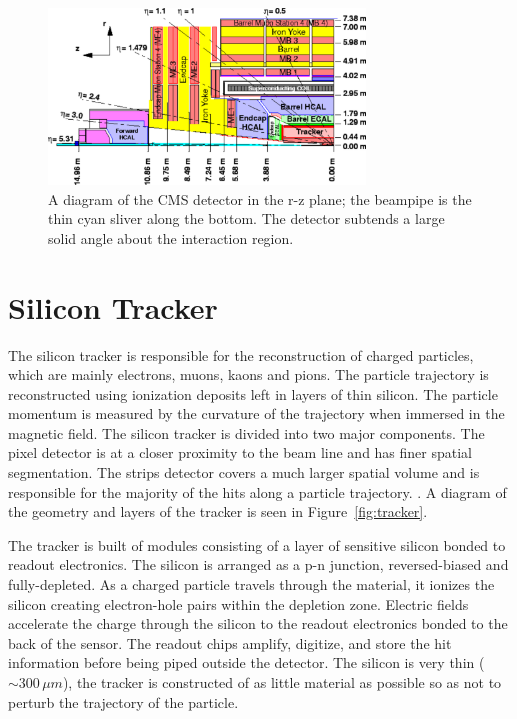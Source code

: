 \begin{figure}
\centering
\includegraphics[width=0.75\textwidth]{figs/img41.pdf}
\caption[A diagram of the CMS detector in the r-z plane.]{A diagram of the CMS detector in the r-z plane; the beampipe is the thin cyan sliver along the bottom. The detector subtends a large solid angle about the interaction region.}
\label{fig:detectoreta}
\end{figure}

\section{Silicon Tracker}

The silicon tracker is responsible for the reconstruction of charged particles, which are mainly electrons, muons, kaons and pions. The particle trajectory is reconstructed using ionization deposits left in layers of thin silicon. The particle momentum is measured by the curvature of the trajectory when immersed in the magnetic field. The silicon tracker is divided into two major components. The pixel detector is at a closer proximity to the beam line and has finer spatial segmentation. The strips detector covers a much larger spatial volume and is responsible for the majority of the hits along a particle trajectory. \cite{trackertdr, trackertdradd}. A diagram of the geometry and layers of the tracker is seen in Figure~\ref{fig:tracker}.

The tracker is built of modules consisting of a layer of sensitive silicon bonded to readout electronics. The silicon is arranged as a p-n junction, reversed-biased and fully-depleted. As a charged particle travels through the material, it ionizes the silicon creating electron-hole pairs within the depletion zone. Electric fields accelerate the charge through the silicon to the readout electronics bonded to the back of the sensor. The readout chips amplify, digitize, and store the hit information before being piped outside the detector. The silicon is very thin ($\sim300\,\mu m$), the tracker is constructed of as little material as possible so as not to perturb the trajectory of the particle.

